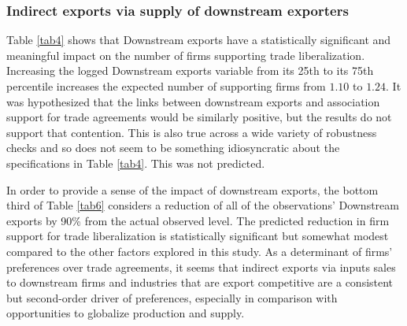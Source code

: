 \documentclass[hidelinks,12pt,letter]{article}
\begin{document}

\subsubsection*{Indirect exports via supply of downstream exporters}
Table \ref{tab4} shows that Downstream exports have a statistically significant and meaningful impact on the number of firms supporting trade liberalization. Increasing the logged Downstream exports variable from its 25th to its 75th percentile increases the expected number of supporting firms from $1.10$ to $1.24$. It was hypothesized that the links between downstream exports and association support for trade agreements would be similarly positive, but the results do not support that contention. This is also true across a wide variety of robustness checks and so does not seem to be something idiosyncratic about the specifications in Table \ref{tab4}. This was not predicted.

In order to provide a sense of the impact of downstream exports, the bottom third of Table \ref{tab6} considers a reduction of all of the observations' Downstream exports by 90\% from the actual observed level. The predicted reduction in firm support for trade liberalization is statistically significant but somewhat modest compared to the other factors explored in this study. As a determinant of firms' preferences over trade agreements, it seems that indirect exports via inputs sales to downstream firms and industries that are export competitive are a consistent but second-order driver of preferences, especially in comparison with opportunities to globalize production and supply. 
\end{document}
